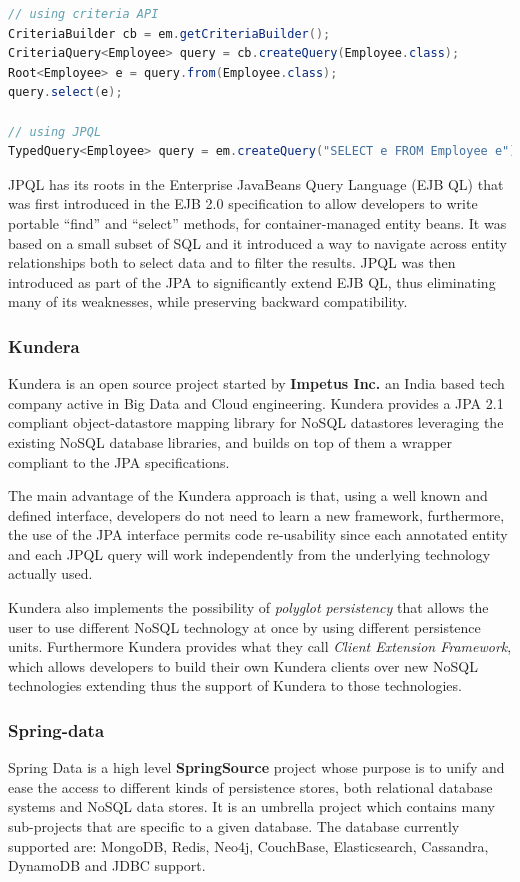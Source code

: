 \begin{lstlisting}[language=Java, caption=Create queries with JPA, label=code:jpa-queries]
// using criteria API
CriteriaBuilder cb = em.getCriteriaBuilder();
CriteriaQuery<Employee> query = cb.createQuery(Employee.class);
Root<Employee> e = query.from(Employee.class);
query.select(e);
  
// using JPQL
TypedQuery<Employee> query = em.createQuery("SELECT e FROM Employee e");
\end{lstlisting}

\noindent JPQL has its roots in the Enterprise JavaBeans Query Language (EJB QL) that was first introduced in the EJB 2.0 specification to allow developers to write portable ``find'' and ``select'' methods, for container-managed entity beans. It was based on a small subset of SQL and it introduced a way to navigate across entity relationships both to select data and to filter the results.
JPQL was then introduced as part of the JPA to significantly extend EJB QL, thus eliminating many of its weaknesses, while preserving backward compatibility.

\subsubsection{Kundera}
Kundera \cite{online:kundera} is an open source project started by \textbf{Impetus Inc.} an India based tech company active in Big Data and Cloud engineering.
Kundera provides a JPA 2.1 compliant object-datastore mapping library for NoSQL datastores leveraging the existing NoSQL database libraries, and builds on top of them a wrapper compliant to the JPA specifications.

\noindent The main advantage of the Kundera approach is that, using a well known and defined interface, developers do not need to learn a new framework, furthermore, the use of the JPA interface permits code re-usability since each annotated entity and each JPQL query will work independently from the underlying technology actually used.

\noindent Kundera also implements the possibility of \textit{polyglot persistency} that allows the user to use different NoSQL technology at once by using different persistence units.
Furthermore Kundera provides what they call \textit{Client Extension Framework}, which allows developers to build their own Kundera clients over new NoSQL technologies extending thus the support of Kundera to those technologies.

\subsubsection{Spring-data}
Spring Data \cite{online:spring-data} is a high level \textbf{SpringSource} project whose purpose is to unify and ease the access to different kinds of persistence stores, both relational database systems and NoSQL data stores. It is an umbrella project which contains many sub-projects that are specific to a given database. The database currently supported are: MongoDB, Redis, Neo4j, CouchBase, Elasticsearch, Cassandra, DynamoDB and JDBC support.

